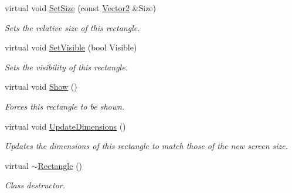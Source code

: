 \begin{DoxyCompactItemize}
virtual void \hyperlink{classphys_1_1UI_1_1Rectangle_a5fa81c05e32b454c313f25609a03c58f}{SetSize} (const \hyperlink{classphys_1_1Vector2}{Vector2} \&Size)
\begin{DoxyCompactList}\small\item\em Sets the relative size of this rectangle. \item\end{DoxyCompactList}\item 
virtual void \hyperlink{classphys_1_1UI_1_1Rectangle_a4fa5021010e8cdaf9a9e35b3d4c82461}{SetVisible} (bool Visible)
\begin{DoxyCompactList}\small\item\em Sets the visibility of this rectangle. \item\end{DoxyCompactList}\item 
\hypertarget{classphys_1_1UI_1_1Rectangle_ab408c7607150b24fbc4f70870705a121}{
virtual void \hyperlink{classphys_1_1UI_1_1Rectangle_ab408c7607150b24fbc4f70870705a121}{Show} ()}
\label{classphys_1_1UI_1_1Rectangle_ab408c7607150b24fbc4f70870705a121}

\begin{DoxyCompactList}\small\item\em Forces this rectangle to be shown. \item\end{DoxyCompactList}\item 
virtual void \hyperlink{classphys_1_1UI_1_1Rectangle_a090cfa5a1298c333335258d52d81c017}{UpdateDimensions} ()
\begin{DoxyCompactList}\small\item\em Updates the dimensions of this rectangle to match those of the new screen size. \item\end{DoxyCompactList}\item 
\hypertarget{classphys_1_1UI_1_1Rectangle_a8862c7e04c2b8911eac4a2d3b6aff165}{
virtual \hyperlink{classphys_1_1UI_1_1Rectangle_a8862c7e04c2b8911eac4a2d3b6aff165}{$\sim$Rectangle} ()}
\label{classphys_1_1UI_1_1Rectangle_a8862c7e04c2b8911eac4a2d3b6aff165}

\begin{DoxyCompactList}\small\item\em Class destructor. \item\end{DoxyCompactList}\end{DoxyCompactItemize}
